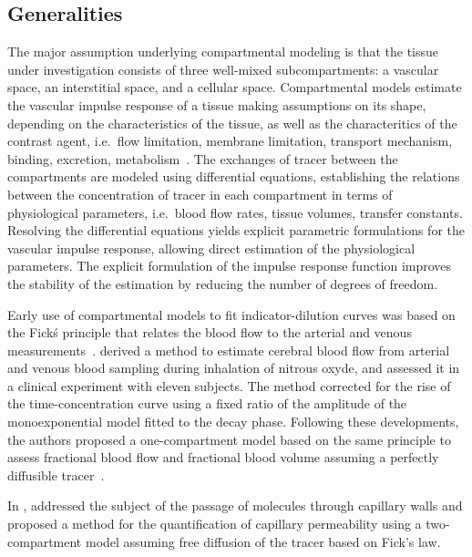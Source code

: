 \subsection{Generalities}
The major assumption underlying compartmental modeling is that the tissue under investigation consists of three well-mixed subcompartments: a vascular space, an interstitial space, and a cellular space.
Compartmental models estimate the vascular impulse response of a tissue making assumptions on its shape, depending on the characteristics of the tissue, as well as the characteritics of the contrast agent, i.e.~flow limitation, membrane limitation, transport mechanism, binding, excretion, metabolism~\cite{Gerlowski:1983tz}.
The exchanges of tracer between the compartments are modeled using differential equations, establishing the relations between the concentration of tracer in each compartment in terms of physiological parameters, i.e.~blood flow rates, tissue volumes, transfer constants. 
Resolving the differential equations yields explicit parametric formulations for the vascular impulse response, allowing direct estimation of the physiological parameters.
The explicit formulation of the impulse response function improves the stability of the estimation by reducing the number of degrees of freedom.

Early use of compartmental models to fit indicator-dilution curves was based on the Fick\'s principle that relates the blood flow to the arterial and venous measurements~\cite{Kety:1944iv,Kety:1948je}.
\citet{Kety:1944iv} derived a method to estimate cerebral blood flow from arterial and venous blood sampling during inhalation of nitrous oxyde, and assessed it in a clinical experiment with eleven subjects.
The method corrected for the rise of the time-concentration curve using a fixed ratio of the amplitude of the monoexponential model fitted to the decay phase. 
Following these developments, the authors proposed a one-compartment model based on the same principle to assess fractional blood flow and fractional blood volume assuming a perfectly diffusible tracer~\cite{Kety:1951tp}.

In \citeyear{Pappenheimer:1953tx}, \citet{Pappenheimer:1953tx} addressed the subject of the passage of molecules through capillary walls and proposed a method for the quantification of capillary permeability using a two-compartment model assuming free diffusion of the tracer based on Fick's law.

